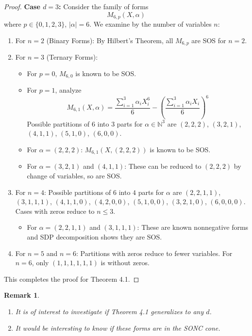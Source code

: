 \documentclass{article}
\newtheorem{remark}{Remark}
\begin{document}
\begin{proof}
	\textbf{Case $d=3$:}
Consider the family of forms
\[
   M_{6,p}(X, \alpha)
\]
where $p \in \{0,1,2,3\}$, $|\alpha|=6$. We examine by the number of variables $n$:
\begin{enumerate}
   \item For $n=2$ (Binary Forms): By Hilbert's Theorem, all $M_{6,p}$ are SOS for $n=2$.
   \item For $n=3$ (Ternary Forms):
      \begin{itemize}
         \item For $p=0$, $M_{6,0}$ is known to be SOS.
         \item For $p=1$, analyze
         \[
            M_{6,1}(X, \alpha) = \frac{\sum_{i=1}^3 \alpha_i X_i^6}{6} - \left( \frac{\sum_{i=1}^3 \alpha_i X_i}{6} \right)^6
         \]
         Possible partitions of $6$ into $3$ parts for $\alpha \in \mathbb{N}^3$ are $(2,2,2)$, $(3,2,1)$, $(4,1,1)$, $(5,1,0)$,
         $(6,0,0)$.
         \item For $\alpha=(2,2,2)$: $M_{6,1}(X,(2,2,2))$ is known to be SOS.
         \item For $\alpha=(3,2,1)$ and $(4,1,1)$: These can be reduced to $(2,2,2)$ by change of variables, so are SOS.
      \end{itemize}
   \item For $n=4$: Possible partitions of $6$ into $4$ parts for $\alpha$ are $(2,2,1,1)$, $(3,1,1,1)$, $(4,1,1,0)$, $(4,2,0,0)$, $(5,1,0,0)$, $(3,2,1,0)$, $(6,0,0,0)$. Cases with zeros reduce to $n \leq 3$.
      \begin{itemize}
         \item For $\alpha=(2,2,1,1)$ and $(3,1,1,1)$: These are known nonnegative forms and SDP decomposition shows
         they are SOS.
      \end{itemize}
   \item For $n=5$ and $n=6$: Partitions with zeros reduce to fewer variables. For $n=6$, only $(1,1,1,1,1,1)$ is without zeros.
\end{enumerate}
This completes the proof for Theorem 4.1.
\end{proof}

\begin{remark}
\begin{enumerate}
   \item It is of interest to investigate if Theorem 4.1 generalizes to any $d$.
   \item It would be interesting to know if these forms are in the SONC cone.
\end{enumerate}
\end{remark}
\end{document}
